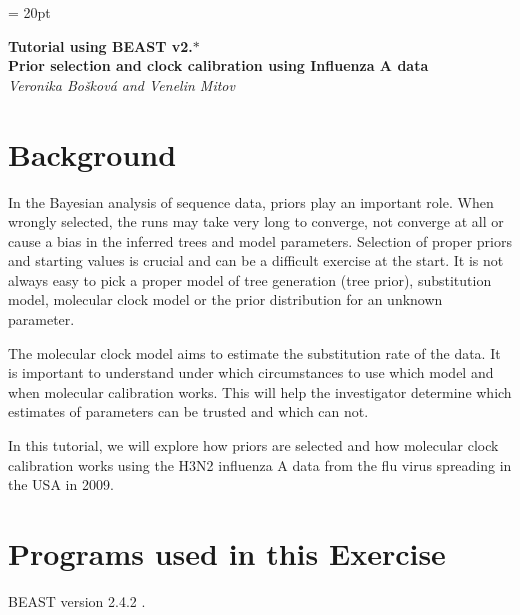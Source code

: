 \documentclass[11pt]{article}
\begin{document}
\renewcommand{\headrulewidth}{0.5pt}
\headsep = 20pt
\lhead{ }

\thispagestyle{plain}

\begin{center}
\textbf{\LARGE Tutorial using BEAST v2.$*$}\\\vspace{2mm}
\textbf{\textcolor{mycol}{\Large Prior selection and clock calibration using Influenza A data}}\\
\vspace{4mm}
{\Large {\em Veronika Bo\v{s}kov\'a and Venelin Mitov}}
\end{center}

\bigskip
\section{Background}
In the Bayesian analysis of sequence data, priors play an important role. When wrongly selected, the runs may take very long to converge, not converge at all or cause a bias in the inferred trees and model parameters. Selection of proper priors and starting values is crucial and can be a difficult exercise at the start. It is not always easy to pick a proper model of tree generation (tree prior), substitution model, molecular clock model or the prior distribution for an unknown parameter. 

The molecular clock model aims to estimate the substitution rate of the data. It is important to understand under which circumstances to use which model and when molecular calibration works. This will help the investigator determine which estimates of parameters can be trusted and which can not.

In this tutorial, we will explore how priors are selected and how molecular clock calibration works using the H3N2 influenza A data from the flu virus spreading in the USA in 2009. 

\bigskip
\section{Programs used in this Exercise}\label{programsSec}


BEAST version 2.4.2 \citep{drummond06,drummond07,Bouckaert2014}. 

\end{document}
